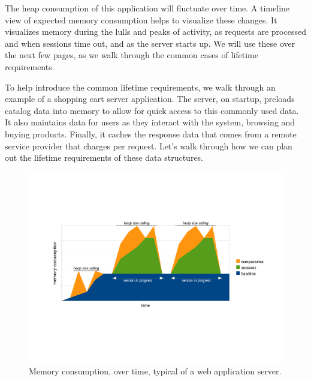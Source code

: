 The heap consumption of this application will fluctuate over time. A timeline
view of expected memory consumption helps to visualize these changes. It
visualizes memory during the lulls and peaks of activity, as requests are
processed and when sessions time out, and as the server starts up. We will use
these over the next few pages, as we walk through the common cases of lifetime
requirements.




To help introduce the common lifetime requirements, we walk through an example of
a shopping cart server application. The server, on startup, preloads catalog data
into memory to allow for quick access to this commonly used data. It also
maintains data for users as they interact with the system, browsing and buying
products. Finally, it caches the response data that comes from a remote service
provider that charges per request. Let's walk through how we can plan out the
lifetime requirements of these data structures.

\begin{figure}
	\centering
	\includegraphics[width=\textwidth]{part4/Figures/lifetime/timeline-base-session-temps}
	\caption{Memory consumption, over time, typical of a web application server.}
	\label{fig:timeline-base-session-temps}
\end{figure}

